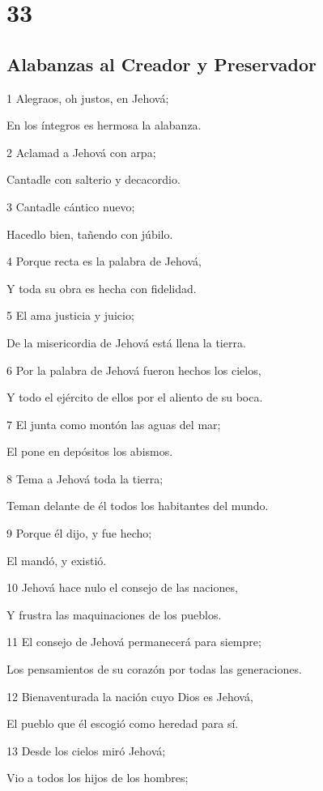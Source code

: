 \chapter{33}

\section*{Alabanzas al Creador y Preservador}

\par 1 Alegraos, oh justos, en Jehová;
\par En los íntegros es hermosa la alabanza.
\par 2 Aclamad a Jehová con arpa;
\par Cantadle con salterio y decacordio.
\par 3 Cantadle cántico nuevo;
\par Hacedlo bien, tañendo con júbilo.
\par 4 Porque recta es la palabra de Jehová,
\par Y toda su obra es hecha con fidelidad.
\par 5 El ama justicia y juicio;
\par De la misericordia de Jehová está llena la tierra.
\par 6 Por la palabra de Jehová fueron hechos los cielos,
\par Y todo el ejército de ellos por el aliento de su boca.
\par 7 El junta como montón las aguas del mar;
\par El pone en depósitos los abismos.
\par 8 Tema a Jehová toda la tierra;
\par Teman delante de él todos los habitantes del mundo.
\par 9 Porque él dijo, y fue hecho;
\par El mandó, y existió.
\par 10 Jehová hace nulo el consejo de las naciones,
\par Y frustra las maquinaciones de los pueblos.
\par 11 El consejo de Jehová permanecerá para siempre;
\par Los pensamientos de su corazón por todas las generaciones.
\par 12 Bienaventurada la nación cuyo Dios es Jehová,
\par El pueblo que él escogió como heredad para sí.
\par 13 Desde los cielos miró Jehová;
\par Vio a todos los hijos de los hombres;
